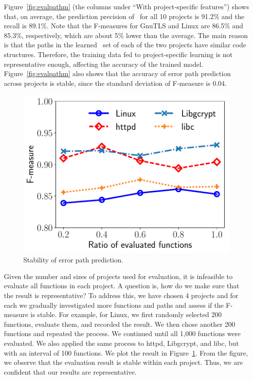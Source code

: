 \documentclass[12pt]{report}	%
\begin{document}
Figure~\ref{fig:evalpathm} (the columns under ``With project-specific features'')
shows that, on average, the prediction precision of \newTool\ for all
10 projects is 91.2\% and the recall is 89.1\%. 
%
Note that the F-measures for GnuTLS and Linux are
86.5\% and 85.3\%, respectively,
which are about 5\% lower than the average.
The main reason is that
the paths in the learned \typical\ set of each of the two projects
have similar code structures.
%
Therefore, the training data fed to project-specific learning
is not representative enough, affecting the accuracy of the trained model.
%
Figure~\ref{fig:evalpathm} also shows that the accuracy of error path prediction 
across projects is stable, since
the standard deviation of F-measure is 0.04.

\begin{figure}
\centering
\includegraphics[width=0.65\linewidth]{images/stab.pdf}
\caption{Stability of error path prediction.}
\label{fig:change}
\end{figure}

%
Given the number and sizes of projects used for evaluation, 
it is infeasible to evaluate all functions in each project. 
A question is, how do we make sure that the result is representative?
To address this, we have chosen 4 projects and for each
we gradually investigated more functions and paths and 
assess if the F-measure is stable. For example, for Linux,
we first randomly selected 200 functions, evaluate them, and recorded
the result. We then chose another 200 functions and repeated the process.
We continued until all 1,000 functions were evaluated. 
We also applied the same process
to httpd, Libgcrypt, and libc, but with an interval of 100 functions.
We plot the result in Figure~\ref{fig:change}. From the figure, we observe that the evaluation
result is stable within each project. Thus, we are confident that our
results are representative.
\end{document}
